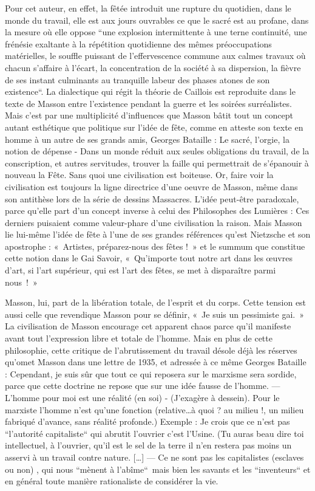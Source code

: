  Pour cet auteur, en effet, la fêtée introduit une rupture du quotidien, dans le monde du travail, elle est aux jours ouvrables ce que le sacré est au profane, dans la mesure où elle oppose “une explosion intermittente à une terne continuité, une frénésie exaltante à la répétition quotidienne des mêmes préoccupations matérielles, le souffle puissant de l’effervescence commune aux calmes travaux où chacun s’affaire à l’écart, la concentration de la société à sa dispersion, la fièvre de ses instant culminants au tranquille labeur des phases atones de son existence“. 
	La dialectique qui régit la théorie de Caillois est reproduite dans le texte de  Masson entre l’existence pendant la guerre et les soirées surréalistes. Mais c’est par une multiplicité d’influences que Masson bâtit tout un concept autant esthétique que politique sur l’idée de fête, comme en atteste   son texte en homme à un autre de ses grands amis, Georges Bataille :
Le sacré, l’orgie, la notion de dépense - Dans un monde réduit aux seules obligations du travail, de la conscription, et autres servitudes, trouver la faille qui permettrait de s’épanouir à nouveau la Fête. Sans quoi une civilisation est boiteuse. 
	Or, faire voir la civilisation est toujours la ligne directrice d’une oeuvre de Masson, même dans son antithèse lors de la série de dessins Massacres. L’idée peut-être paradoxale, parce qu’elle part d’un concept inverse à celui des Philosophes des Lumières : Ces derniers puisaient comme valeur-phare d’une civilisation la raison. Mais Masson lie lui-même l’idée de fête à l’une de ses grandes références qu’est Nietzsche  et son apostrophe  : « Artistes, préparez-nous des fêtes ! » et le summum que constitue cette notion dans le Gai Savoir, « Qu’importe tout notre art dans les œuvres d’art, si l’art supérieur, qui est l’art des fêtes, se met à disparaître parmi nous ! »

	Masson, lui, part de la libération totale, de l’esprit et du corps. Cette tension est aussi celle que revendique Masson pour se définir, « Je suis un pessimiste  gai. » La civilisation de Masson encourage cet apparent chaos parce qu’il manifeste avant tout l’expression libre et totale de l’homme. Mais en plus de cette philosophie, cette critique de l’abrutissement du travail désole déjà les réserves qu’omet Masson dans une lettre de 1935, et adressée à ce même Georges Bataille :
Cependant, je suis sûr que tout ce qui reposera sur le marxisme sera sordide, parce que cette doctrine ne repose que sur une idée fausse de l’homme. — L’homme pour moi est une réalité (en soi) - (J’exagère à dessein). Pour le marxiste l’homme n’est qu’une fonction (relative…à quoi ? au milieu !, un milieu fabriqué d’avance, sans réalité profonde.) Exemple : Je crois que ce n’est pas “l’autorité capitaliste“ qui abrutit l’ouvrier c’est l’Usine. (Tu auras beau dire toi intellectuel, à l’ouvrier, qu’il est le sel de la terre il n’en restera pas moins un asservi à un travail contre nature. […] — Ce ne sont pas les capitalistes (esclaves ou non) , qui nous “mènent à l’abîme“ mais bien les savants et les “inventeurs“ et en général toute manière rationaliste de considérer la vie.

